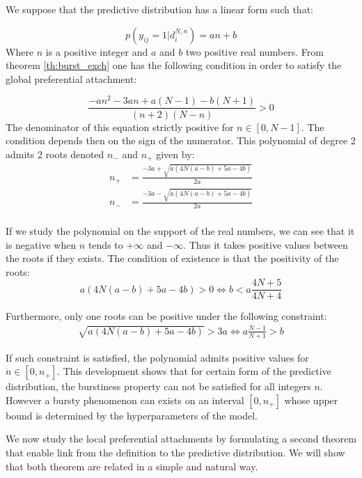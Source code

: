 We suppose that the predictive distribution has a linear form such that:

\begin{equation*}
p(y_{ij}=1 | d_i^{N,n}) = an+b
\end{equation*}  
Where $n$ is a positive integer and $a$ and $b$ two positive real numbers. From theorem \ref{th:burst_exch} one has the following condition in order to satisfy the global preferential attachment:

\begin{equation} \label{eq:polynom}
\frac{-an^2 -3an +a(N-1)-b(N+1)}{(n+2)(N-n)} > 0 
\end{equation}
The denominator of this equation strictly positive for $n \in [0, N-1]$. The condition depends then on the sign of the numerator. This polynomial of degree 2 admits 2 roots denoted $n_-$ and $n_+$ given by:
\begin{align*}
n_+ &= \frac{-3a + \sqrt{a(4N(a-b)+5a-4b)}}{2a} \\
n_- &= \frac{-3a - \sqrt{a(4N(a-b)+5a-4b)}}{2a} \\
\end{align*}

If we study the polynomial on the support of the real numbers, we can see that it is negative when $n$ tends to $+\infty$ and $-\infty$. Thus it takes positive values between the roots if they exists. The condition of existence is that the positivity of the roots:
\begin{equation*}
a(4N(a-b)+5a-4b) > 0 \iff b < a \frac{4N+5}{4N+4}
\end{equation*}

Furthermore, only one roots can be positive under the following constraint:
\begin{align*}
\sqrt{a(4N(a-b)+5a-4b)} > 3a \iff a\frac{N-1}{N+1} > b
\end{align*}

If such constraint is satisfied, the polynomial admits positive values for $n \in [0, n_+]$. This development shows that for certain form of the predictive distribution, the burstiness property can not be satisfied for all integers $n$. However a bursty phenomenon can exists on an interval $[0, n_+]$ whose upper bound is determined by the hyperparameters of the model.

We now study the local preferential attachments by formulating a second theorem that enable link from the definition to the predictive distribution. We will show that both theorem are related in a simple and natural way.

